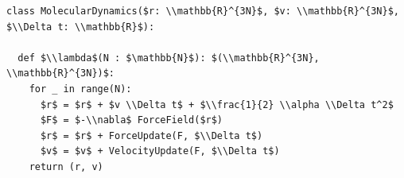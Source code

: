 \documentclass[border=10pt]{standalone}
\begin{document}
\begin{lstlisting}
class MolecularDynamics($r: \\mathbb{R}^{3N}$, $v: \\mathbb{R}^{3N}$, $\\Delta t: \\mathbb{R}$):

  def $\\lambda$(N : $\mathbb{N}$): $(\\mathbb{R}^{3N}, \\mathbb{R}^{3N})$:
    for _ in range(N):
      $r$ = $r$ + $v \\Delta t$ + $\\frac{1}{2} \\alpha \\Delta t^2$
      $F$ = $-\\nabla$ ForceField($r$)
      $r$ = $r$ + ForceUpdate(F, $\\Delta t$)
      $v$ = $v$ + VelocityUpdate(F, $\\Delta t$)
    return (r, v)
\end{lstlisting}
\end{document}
